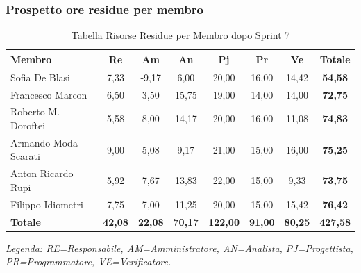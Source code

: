 \subsubsection{Prospetto ore residue per membro}
\begin{table}[H]
    \centering
    \renewcommand{\arraystretch}{1.3}
    \begin{tabularx}{\textwidth}{|X|c|c|c|c|c|c|c|}
        \hline
        \textbf{Membro} & \textbf{Re} & \textbf{Am} & \textbf{An} &
        \textbf{Pj} & \textbf{Pr} & \textbf{Ve} & \textbf{Totale} \\
        \hline
        Sofia De Blasi           &  7,33 &  -9,17 &  6,00 & 20,00 & 16,00 & 14,42 & \textbf{54,58} \\
        Francesco Marcon         &  6,50 &  3,50 & 15,75 & 19,00 & 14,00 & 14,00 & \textbf{72,75} \\
        Roberto M. Doroftei      &  5,58 &  8,00 & 14,17 & 20,00 & 16,00 & 11,08 & \textbf{74,83} \\
        Armando Moda Scarati     &  9,00 &  5,08 & 9,17 & 21,00 & 15,00 & 16,00 & \textbf{75,25} \\
        Anton Ricardo Rupi       &  5,92 &  7,67 & 13,83 & 22,00 & 15,00 &  9,33 & \textbf{73,75} \\
        Filippo Idiometri        &  7,75 &  7,00 & 11,25 & 20,00 & 15,00 & 15,42 & \textbf{76,42} \\
        \hline
        \textbf{Totale} &
        \textbf{42,08} & \textbf{22,08} & \textbf{70,17} &
        \textbf{122,00} & \textbf{91,00} & \textbf{80,25} &
        \textbf{427,58} \\
        \hline
    \end{tabularx}
    \begin{minipage}{\textwidth}
        \smallskip
        \footnotesize\textit{Legenda: RE=Responsabile, AM=Amministratore,
        AN=Analista, PJ=Progettista, PR=Programmatore, VE=Verificatore.}
    \end{minipage}
    \caption{Tabella Risorse Residue per Membro dopo Sprint 7}
\end{table}

